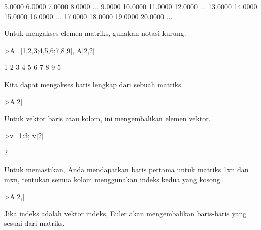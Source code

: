 \documentclass{article}
\begin{document}
\begin{eulernotebook}
\begin{euleroutput}
       5.0000      6.0000      7.0000      8.0000     ...
       9.0000     10.0000     11.0000     12.0000     ...
      13.0000     14.0000     15.0000     16.0000     ...
      17.0000     18.0000     19.0000     20.0000     ...
\end{euleroutput}
\begin{eulercomment}
Untuk mengakses elemen matriks, gunakan notasi kurung.
\end{eulercomment}
\begin{eulerprompt}
>A=[1,2,3;4,5,6;7,8,9], A[2,2]
\end{eulerprompt}
\begin{euleroutput}
              1             2             3 
              4             5             6 
              7             8             9 
  5
\end{euleroutput}
\begin{eulercomment}
Kita dapat mengakses baris lengkap dari sebuah matriks.
\end{eulercomment}
\begin{eulerprompt}
>A[2]
\end{eulerprompt}
\begin{euleroutput}
  [4,  5,  6]
\end{euleroutput}
\begin{eulercomment}
Untuk vektor baris atau kolom, ini mengembalikan elemen vektor.
\end{eulercomment}
\begin{eulerprompt}
>v=1:3; v[2]
\end{eulerprompt}
\begin{euleroutput}
  2
\end{euleroutput}
\begin{eulercomment}
Untuk memastikan, Anda mendapatkan baris pertama untuk matriks 1xn dan
mxn, tentukan semua kolom menggunakan indeks kedua yang kosong.
\end{eulercomment}
\begin{eulerprompt}
>A[2,]
\end{eulerprompt}
\begin{euleroutput}
  [4,  5,  6]
\end{euleroutput}
\begin{eulercomment}
Jika indeks adalah vektor indeks, Euler akan mengembalikan baris-baris
yang sesuai dari matriks.



\end{eulercomment}
\end{eulernotebook}
\end{document}
